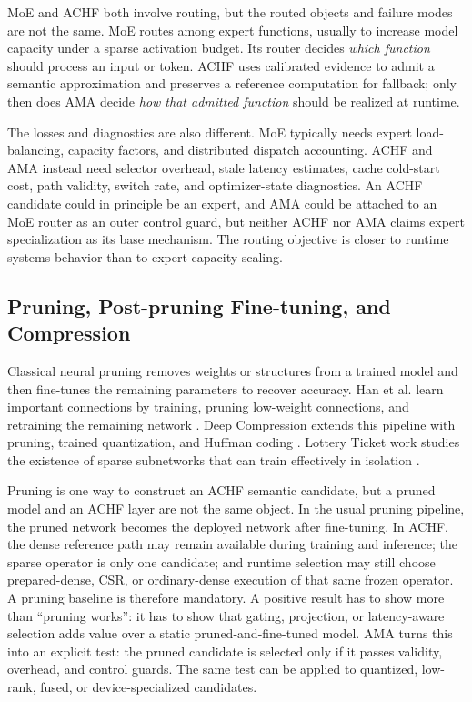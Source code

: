 \documentclass{article}
\newcommand{\achf}{\textsc{ACHF}}
\newcommand{\ama}{\textsc{AMA}}
\begin{document}
MoE and \achf{} both involve routing, but the routed objects and failure modes
are not the same. MoE routes among expert functions, usually to increase model
capacity under a sparse activation budget. Its router decides \emph{which
function} should process an input or token. \achf{} uses calibrated evidence to
admit a semantic approximation and preserves a reference computation for
fallback; only then does \ama{} decide \emph{how that admitted function} should
be realized at runtime.

The losses and diagnostics are also different. MoE typically needs expert
load-balancing, capacity factors, and distributed dispatch accounting. \achf{} and
\ama{} instead need selector overhead, stale latency estimates, cache cold-start
cost, path validity, switch rate, and optimizer-state diagnostics. An \achf{}
candidate could in principle be an expert, and \ama{} could be attached to an MoE
router as an outer control guard, but neither \achf{} nor \ama{} claims expert
specialization as its base mechanism. The routing objective is closer to
runtime systems behavior than to expert capacity scaling.

\subsection{Pruning, Post-pruning Fine-tuning, and Compression}

Classical neural pruning removes weights or structures from a trained model and
then fine-tunes the remaining parameters to recover accuracy. Han et al. learn
important connections by training, pruning low-weight connections, and
retraining the remaining network \cite{han2015learning}. Deep Compression
extends this pipeline with pruning, trained quantization, and Huffman coding
\cite{han2015deepcompression}. Lottery Ticket work studies the existence of
sparse subnetworks that can train effectively in isolation
\cite{frankle2019lottery}.

Pruning is one way to construct an \achf{} semantic candidate, but a pruned model
and an \achf{} layer are not the same object. In the usual pruning pipeline, the
pruned network becomes the deployed network after fine-tuning. In \achf{}, the
dense reference path may remain available during training and inference; the
sparse operator is only one candidate; and runtime selection may still choose
prepared-dense, CSR, or ordinary-dense execution of that same frozen operator.
A pruning
baseline is therefore mandatory. A positive result has to show more than
``pruning works'': it has to show that gating, projection, or latency-aware
selection adds value over a static pruned-and-fine-tuned model. \ama{} turns
this into an explicit test: the pruned candidate is selected only if it passes
validity, overhead, and control guards. The same test can be applied to
quantized, low-rank, fused, or device-specialized candidates.
\end{document}
